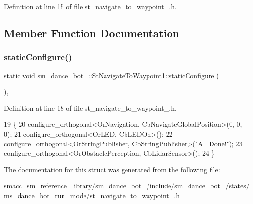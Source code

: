 Definition at line 15 of file st\+\_\+navigate\+\_\+to\+\_\+waypoint\+\_.\+h.



\subsection{Member Function Documentation}
\mbox{\label{structsm__dance__bot__2_1_1StNavigateToWaypoint1_a5461cc9743f6f36ab01092d59e65c75d}} 
\subsubsection{\texorpdfstring{static\+Configure()}{staticConfigure()}}
{\footnotesize\ttfamily static void sm\+\_\+dance\+\_\+bot\+\_\+::\+St\+Navigate\+To\+Waypoint1\+::static\+Configure (\begin{DoxyParamCaption}{ }\end{DoxyParamCaption})\hspace{0.3cm}{\ttfamily [inline]}, {\ttfamily [static]}}



Definition at line 18 of file st\+\_\+navigate\+\_\+to\+\_\+waypoint\+\_.\+h.


\begin{DoxyCode}
19   \{
20     configure\_orthogonal<OrNavigation, CbNavigateGlobalPosition>(0, 0, 0);
21     configure\_orthogonal<OrLED, CbLEDOn>();
22     configure\_orthogonal<OrStringPublisher, CbStringPublisher>(\textcolor{stringliteral}{"All Done!"});
23     configure\_orthogonal<OrObstaclePerception, CbLidarSensor>();
24   \}
\end{DoxyCode}


The documentation for this struct was generated from the following file\+:\begin{DoxyCompactItemize}
\item 
smacc\+\_\+sm\+\_\+reference\+\_\+library/sm\+\_\+dance\+\_\+bot\+\_/include/sm\+\_\+dance\+\_\+bot\+\_/states/ms\+\_\+dance\+\_\+bot\+\_\+run\+\_\+mode/\hyperlink{2_2include_2sm__dance__bot__2_2states_2ms__dance__bot__run__mode_2st__navigate__to__waypoint__1_8h}{st\+\_\+navigate\+\_\+to\+\_\+waypoint\+\_.\+h}\end{DoxyCompactItemize}

